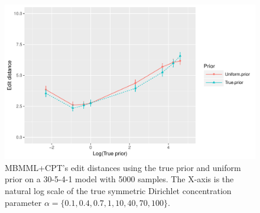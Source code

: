 \begin{figure}[H]
  \centering
    \includegraphics[scale=0.6]{figures/ed_vs_trueprior_30_5_4_alpha_134445_5000.pdf}
  \caption{MBMML+CPT's edit distances using the true prior and uniform prior on a 30-5-4-1 model with 5000 samples. The X-axis is the natural log scale of the true symmetric Dirichlet concentration parameter $\alpha = \{0.1, 0.4, 0.7, 1, 10, 40, 70, 100\}$.}
  \label{fg:wrong_prior_5000}
\end{figure}

